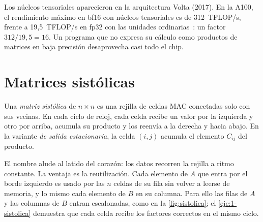 Los núcleos tensoriales aparecieron en la arquitectura Volta (2017). En la A100, el rendimiento máximo en bf16 con núcleos tensoriales es de 312~TFLOP/s, frente a 19{,}5~TFLOP/s en fp32 con las unidades ordinarias~\cite{a100}: un factor $312/19{,}5=16$. Un programa que no expresa su cálculo como productos de matrices en baja precisión desaprovecha casi todo el chip.

\section{Matrices sistólicas}

\begin{definicion}
Una \emph{matriz sistólica} de $n\times n$ es una rejilla de celdas MAC conectadas solo con sus vecinas. En cada ciclo de reloj, cada celda recibe un valor por la izquierda y otro por arriba, acumula su producto y los reenvía a la derecha y hacia abajo. En la variante \emph{de salida estacionaria}, la celda $(i,j)$ acumula el elemento $C_{ij}$ del producto.
\end{definicion}

El nombre alude al latido del corazón: los datos recorren la rejilla a ritmo constante. La ventaja es la reutilización. Cada elemento de $A$ que entra por el borde izquierdo es usado por las $n$ celdas de su fila sin volver a leerse de memoria, y lo mismo cada elemento de $B$ en su columna. Para ello las filas de $A$ y las columnas de $B$ entran escalonadas, como en la \cref{fig:sistolica}; el \cref{eje:1-sistolica} demuestra que cada celda recibe los factores correctos en el mismo ciclo.

